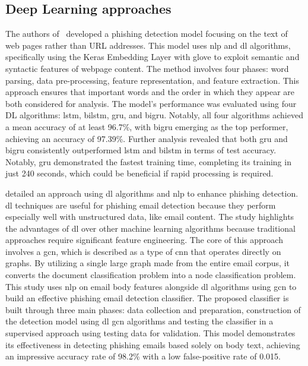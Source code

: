 \subsection{Deep Learning approaches}

The authors of~\cite{Benavides-Astudillo2023} developed a phishing detection model focusing on the text of web pages rather than URL addresses. This model uses \ac{nlp} and \ac{dl} algorithms, specifically using the Keras Embedding Layer with \ac{glove} to exploit semantic and syntactic features of webpage content. The method involves four phases: word parsing, data pre-processing, feature representation, and feature extraction. This approach ensures that important words and the order in which they appear are both considered for analysis.
The model's performance was evaluated using four DL algorithms: \ac{lstm}, \ac{bilstm}, \ac{gru}, and \ac{bigru}. Notably, all four algorithms achieved a mean accuracy of at least 96.7\%, with \ac{bigru} emerging as the top performer, achieving an accuracy of 97.39\%.
Further analysis revealed that both \ac{gru} and \ac{bigru} consistently outperformed \ac{lstm} and \ac{bilstm} in terms of test accuracy. Notably, \ac{gru} demonstrated the fastest training time, completing its training in just 240 seconds, which could be beneficial if rapid processing is required.

\citet{ALHOGAIL2021102414} detailed an approach using \ac{dl} algorithms and \ac{nlp} to enhance phishing detection. \ac{dl} techniques are useful for phishing email detection because they perform especially well with unstructured data, like email content. The study highlights the advantages of \ac{dl} over other machine learning algorithms because traditional approaches require significant feature engineering. The core of this approach involves a \ac{gcn}, which is described as a type of \ac{cnn} that operates directly on graphs. By utilizing a single large graph made from the entire email corpus, it converts the document classification problem into a node classification problem. This study uses \ac{nlp} on email body features alongside \ac{dl} algorithms using \ac{gcn} to build an effective phishing email detection classifier. The proposed classifier is built through three main phases: data collection and preparation, construction of the detection model using \ac{dl} \ac{gcn} algorithms and testing the classifier in a supervised approach using testing data for validation. This model demonstrates its effectiveness in detecting phishing emails based solely on body text, achieving an impressive accuracy rate of 98.2\% with a low false-positive rate of 0.015.

